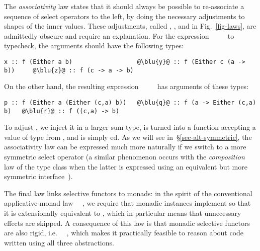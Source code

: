 {%

The \emph{associativity} law states that it should always be possible to
re-associate a sequence of select operators to the left, by doing the necessary
adjustments to shapes of the inner values. These adjustments, called ,
, and  in Fig.~\ref{fig-laws}, are admittedly obscure and require an
explanation. For the expression ~~\hs{(}~~ to
typecheck, the arguments should have the following types:

\begin{verbatim}
x :: f (Either a b)                  @\blu{y}@ :: f (Either c (a -> b))     @\blu{z}@ :: f (c -> a -> b)
\end{verbatim}

\noindent
On the other hand, the resulting expression
~~~~ has arguments of these types:

\begin{verbatim}
p :: f (Either a (Either (c,a) b))   @\blu{q}@ :: f (a -> Either (c,a) b)   @\blu{r}@ :: f ((c,a) -> b)
\end{verbatim}

\noindent
To adjust , we inject it in a larger sum type,  is turned into a
function accepting a value of type  from , and  is simply
ed. As we will see in~\S\ref{sec-alt-symmetric}, the associativity
law can be expressed much more naturally if we switch to a more symmetric select
operator (a similar phenomenon occurs with the \emph{composition} law of
the  type class when the latter is expressed using an equivalent
but more symmetric  interface~\citep{mcbride2008applicative}).

The final law links selective functors to monads: in the spirit of the
conventional applicative-monad law \hs{(<*>)}~\hs{=}~, we require that
monadic instances implement  so that it is extensionally equivalent
to , which in particular means that unnecessary effects are skipped.
A consequence of this law is that monadic selective functors are also rigid,
i.e. \hs{(<*>)}~\hs{=}~, which makes it practically feasible to reason
about code written using all three abstractions.

}
